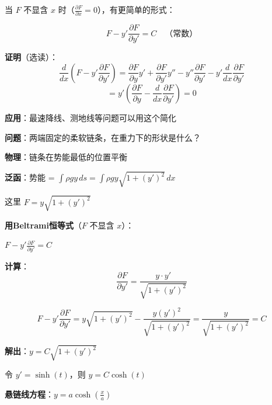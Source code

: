 \documentclass[12pt, a4paper]{ctexart}
\begin{document}
\begin{blackboard}

当 $F$ 不显含 $x$ 时（$\frac{\partial F}{\partial x} = 0$），有更简单的形式：

\[
\boxed{F - y' \frac{\partial F}{\partial y'} = C \quad \text{（常数）}}
\]

\textbf{证明}（选读）：
\[
\frac{d}{dx}\left( F - y' \frac{\partial F}{\partial y'} \right) = \frac{\partial F}{\partial y}y' + \frac{\partial F}{\partial y'}y'' - y''\frac{\partial F}{\partial y'} - y'\frac{d}{dx}\frac{\partial F}{\partial y'}
\]
\[
= y' \left( \frac{\partial F}{\partial y} - \frac{d}{dx}\frac{\partial F}{\partial y'} \right) = 0
\]

\textbf{应用}：最速降线、测地线等问题可以用这个简化

\end{blackboard}

\begin{blackboard}

\textbf{问题}：两端固定的柔软链条，在重力下的形状是什么？

\begin{center}
\end{center}

\textbf{物理}：链条在势能最低的位置平衡

\textbf{泛函}：势能 = $\int \rho g y \, ds = \int \rho g y \sqrt{1 + (y')^2} \, dx$

这里 $F = y \sqrt{1 + (y')^2}$

\end{blackboard}

\begin{blackboard}[悬链线的求解]

\textbf{用Beltrami恒等式}（$F$ 不显含 $x$）：

$F - y' \frac{\partial F}{\partial y'} = C$

\textbf{计算}：
\[
\frac{\partial F}{\partial y'} = \frac{y \cdot y'}{\sqrt{1 + (y')^2}}
\]

\[
F - y' \frac{\partial F}{\partial y'} = y\sqrt{1 + (y')^2} - \frac{y(y')^2}{\sqrt{1 + (y')^2}} = \frac{y}{\sqrt{1 + (y')^2}} = C
\]

\textbf{解出}：$y = C \sqrt{1 + (y')^2}$

令 $y' = \sinh(t)$，则 $y = C \cosh(t)$

\textbf{悬链线方程}：$y = a \cosh\left(\frac{x}{a}\right)$

\end{blackboard}
\end{document}
